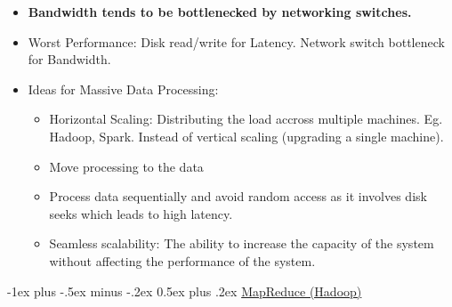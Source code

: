 \documentclass[10pt, landscape]{article}
\makeatletter
\renewcommand{\section}{\@startsection{section}{1}{0mm}%
  {-1ex plus -.5ex minus -.2ex}%
  {0.5ex plus .2ex}%
{\normalfont\large\bfseries}}
\makeatother
\begin{document}
\begin{multicols*}{4}
\begin{itemize}
    \item \textbf{Bandwidth tends to be bottlenecked by networking switches.}
    \item Worst Performance: Disk read/write for Latency. Network switch bottleneck for Bandwidth.
    \item Ideas for Massive Data Processing:
    \begin{itemize}
      \item Horizontal Scaling: Distributing the load accross multiple machines. Eg. Hadoop, Spark. Instead of vertical scaling (upgrading a single machine).
      \item Move processing to the data
      \item Process data sequentially and avoid random access as it involves disk seeks which leads to high latency.
      \item Seamless scalability: The ability to increase the capacity of the system without affecting the performance of the system.
    \end{itemize}
  \end{itemize}

  \section{\underline{MapReduce (Hadoop)}}


\end{multicols*}
\end{document}
